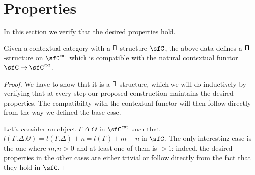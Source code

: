 \section{Properties}

In this section we verify that the desired properties hold.

\begin{prop}
  Given a contextual category with a $\operatorname{\mathsf{\Pi}}$-structure $\sfC$, the above data
  defines a $\operatorname{\mathsf{\Pi}}$-structure on $\sfC^{\cxt}$ which is compatible with the natural
  contextual functor $\sfC\rightarrow\sfC^{\cxt}$.
\end{prop}
\begin{proof}
  We have to
  show that it is a $\operatorname{\mathsf{\Pi}}$-structure, which we will do inductively by verifying
  that at every step our proposed construction maintains the desired properties.
  The compatibility with the contextual functor will then follow directly from
  the way we defined the base case.

  Let's consider an object $\Gamma.\Delta.\Theta$ in $\sfC^{\cxt}$ such that
  $l(\Gamma.\Delta.\Theta)=l(\Gamma.\Delta)+n=l(\Gamma)+m+n$ in $\sfC$. The only
  interesting case is the one where $m,n>0$ and at least one of them is
  $>1$: indeed, the desired properties in the other cases are either
  trivial or follow directly from the fact that they hold in $\sfC$.


\end{proof}
